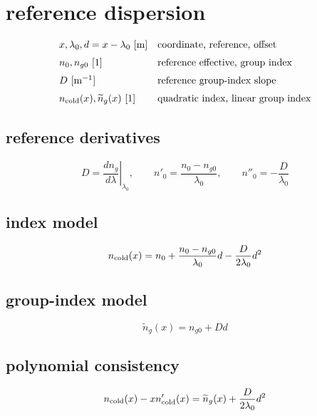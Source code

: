 \section*{reference dispersion}
\[
\begin{array}{ll}x,\lambda_0,d=x-\lambda_0\ [\mathrm m]&\text{coordinate, reference, offset}\\[0.6em]n_0,n_{g0}\ [1]&\text{reference effective, group index}\\[0.6em]D\ [\mathrm{m^{-1}}]&\text{reference group-index slope}\\[0.6em]n_{\rm cold}(x),\widetilde n_g(x)\ [1]&\text{quadratic index, linear group index}\end{array}
\]
\subsection*{reference derivatives}
\[
\displaystyle D=\left.\frac{dn_g}{d\lambda}\right|_{\lambda_0},\qquad n'_0=\frac{n_0-n_{g0}}{\lambda_0},\qquad n''_0=-\frac{D}{\lambda_0}
\]
\subsection*{index model}
\[
\displaystyle n_{\rm cold}(x)=n_0+\frac{n_0-n_{g0}}{\lambda_0}d-\frac{D}{2\lambda_0}d^2
\]
\subsection*{group-index model}
\[
\displaystyle \widetilde n_g(x)=n_{g0}+Dd
\]
\subsection*{polynomial consistency}
\[
\displaystyle n_{\rm cold}(x)-x n'_{\rm cold}(x)=\widetilde n_g(x)+\frac{D}{2\lambda_0}d^2
\]
